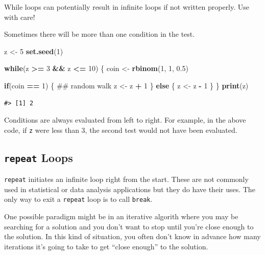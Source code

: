 \documentclass[]{book}
\newenvironment{Shaded}{\begin{snugshade}}{\end{snugshade}}
\newcommand{\KeywordTok}[1]{\textcolor[rgb]{0.13,0.29,0.53}{\textbf{#1}}}
\newcommand{\DecValTok}[1]{\textcolor[rgb]{0.00,0.00,0.81}{#1}}
\newcommand{\FloatTok}[1]{\textcolor[rgb]{0.00,0.00,0.81}{#1}}
\newcommand{\StringTok}[1]{\textcolor[rgb]{0.31,0.60,0.02}{#1}}
\newcommand{\ControlFlowTok}[1]{\textcolor[rgb]{0.13,0.29,0.53}{\textbf{#1}}}
\newcommand{\OperatorTok}[1]{\textcolor[rgb]{0.81,0.36,0.00}{\textbf{#1}}}
\newcommand{\NormalTok}[1]{#1}
\theoremstyle{definition}
\theoremstyle{definition}
\theoremstyle{definition}
\theoremstyle{remark}
\begin{document}
While loops can potentially result in infinite loops if not written
properly. Use with care!

Sometimes there will be more than one condition in the test.

\begin{Shaded}
\begin{Highlighting}[]
\NormalTok{z <-}\StringTok{ }\DecValTok{5}
\KeywordTok{set.seed}\NormalTok{(}\DecValTok{1}\NormalTok{)}

\ControlFlowTok{while}\NormalTok{(z }\OperatorTok{>=}\StringTok{ }\DecValTok{3} \OperatorTok{&&}\StringTok{ }\NormalTok{z }\OperatorTok{<=}\StringTok{ }\DecValTok{10}\NormalTok{) \{}
\NormalTok{        coin <-}\StringTok{ }\KeywordTok{rbinom}\NormalTok{(}\DecValTok{1}\NormalTok{, }\DecValTok{1}\NormalTok{, }\FloatTok{0.5}\NormalTok{)}
        
        \ControlFlowTok{if}\NormalTok{(coin }\OperatorTok{==}\StringTok{ }\DecValTok{1}\NormalTok{) \{  ## random walk}
\NormalTok{                z <-}\StringTok{ }\NormalTok{z }\OperatorTok{+}\StringTok{ }\DecValTok{1}
\NormalTok{        \} }\ControlFlowTok{else}\NormalTok{ \{}
\NormalTok{                z <-}\StringTok{ }\NormalTok{z }\OperatorTok{-}\StringTok{ }\DecValTok{1}
\NormalTok{        \} }
\NormalTok{\}}
\KeywordTok{print}\NormalTok{(z)}
\end{Highlighting}
\end{Shaded}

\begin{verbatim}
#> [1] 2
\end{verbatim}

Conditions are always evaluated from left to right. For example, in the
above code, if \texttt{z} were less than 3, the second test would not
have been evaluated.

\subsection{\texorpdfstring{\texttt{repeat}
Loops}{repeat Loops}}\label{repeat-loops}

\texttt{repeat} initiates an infinite loop right from the start. These
are not commonly used in statistical or data analysis applications but
they do have their uses. The only way to exit a \texttt{repeat} loop is
to call \texttt{break}.

One possible paradigm might be in an iterative algorith where you may be
searching for a solution and you don't want to stop until you're close
enough to the solution. In this kind of situation, you often don't know
in advance how many iterations it's going to take to get ``close
enough'' to the solution.
\end{document}
